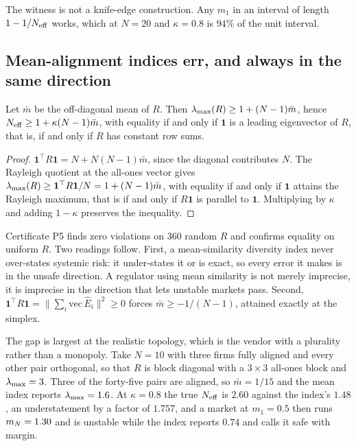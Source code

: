 The witness is not a knife-edge construction. Any $m_1$ in an interval of length $1 - 1/N_{\mathrm{eff}}$ works, which at $N = 20$ and $\kappa = 0.8$ is $94\%$ of the unit interval.

\subsection{Mean-alignment indices err, and always in the same direction}

\begin{aproposition}
\label{aprop:mean}
Let $\bar{m}$ be the off-diagonal mean of $R$. Then $\lambda_{\max}(R) \geq 1 + (N-1)\bar{m}$, hence $N_{\mathrm{eff}} \geq 1 + \kappa(N-1)\bar{m}$, with equality if and only if $\mathbf{1}$ is a leading eigenvector of $R$, that is, if and only if $R$ has constant row sums.
\end{aproposition}

\begin{proof}
$\mathbf{1}^{\top}R\mathbf{1} = N + N(N-1)\bar{m}$, since the diagonal contributes $N$. The Rayleigh quotient at the all-ones vector gives $\lambda_{\max}(R) \geq \mathbf{1}^{\top}R\mathbf{1}/N = 1 + (N-1)\bar{m}$, with equality if and only if $\mathbf{1}$ attains the Rayleigh maximum, that is if and only if $R\mathbf{1}$ is parallel to $\mathbf{1}$. Multiplying by $\kappa$ and adding $1-\kappa$ preserves the inequality.
\end{proof}

Certificate P5 finds zero violations on 360 random $R$ and confirms equality on uniform $R$. Two readings follow. First, a mean-similarity diversity index never over-states systemic risk: it under-states it or is exact, so every error it makes is in the unsafe direction. A regulator using mean similarity is not merely imprecise, it is imprecise in the direction that lets unstable markets pass. Second, $\mathbf{1}^{\top}R\mathbf{1} = \|\sum_i \mathrm{vec}\,\hat{E}_i\|^2 \geq 0$ forces $\bar{m} \geq -1/(N-1)$, attained exactly at the simplex.

The gap is largest at the realistic topology, which is the vendor with a plurality rather than a monopoly. Take $N=10$ with three firms fully aligned and every other pair orthogonal, so that $R$ is block diagonal with a $3\times 3$ all-ones block and $\lambda_{\max} = 3$. Three of the forty-five pairs are aligned, so $\bar{m} = 1/15$ and the mean index reports $\lambda_{\max} = 1.6$. At $\kappa = 0.8$ the true $N_{\mathrm{eff}}$ is $2.60$ against the index's $1.48$, an understatement by a factor of $1.757$, and a market at $m_1 = 0.5$ then runs $m_N = 1.30$ and is unstable while the index reports $0.74$ and calls it safe with margin.

